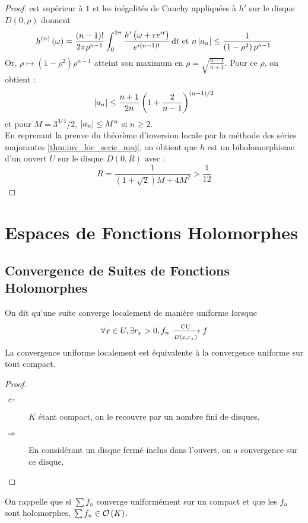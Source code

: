 \documentclass{cours}
\begin{document}
\begin{proof}
    est supérieur à $1$ et les inégalités de Cauchy appliquées à $h'$ sur le disque $D\left(0, \rho\right)$ donnent 
    \begin{equation*}
        h^{\left(n\right)}\left(\omega\right) = \frac{\left(n- 1\right)!}{2\pi\rho^{n-1}}\int_{0}^{2\pi}\frac{h'\left(\omega + re^{it}\right)}{e^{i\left(n - 1\right)t}}{\rm \, d} t \text{ et } n\left|a_{n}\right| \leq \frac{1}{\left(1 - \rho^{2}\right)\rho^{n - 1}}
    \end{equation*}
    Or, $\rho \mapsto \left(1 - \rho^{2}\right)\rho^{n - 1}$ atteint son maximum en $\rho = \sqrt{\frac{n-1}{n + 1}}$. Pour ce $\rho$, on obtient : 
    \begin{equation*}
        \left|a_{n}\right| \leq \frac{n + 1}{2n}\left(1 + \frac{2}{n - 1}\right)^{\left(n-1\right)/2}
    \end{equation*}
    et pour $M = 3^{3/4}/2$, $\left|a_{n}\right| \leq M^{n}$ si $n \geq 2$.\\
    En reprenant la preuve du théorème d'inversion locale par la méthode des séries majorantes \ref{thm:inv_loc_serie_maj}, on obtient que $h$ est un biholomorphisme d'un ouvert $U$ sur le disque $D\left(0, R\right)$ avec : 
    \begin{equation*}
      R = \frac{1}{\left(1 + \sqrt{2}\right)M + 4M^{2}}>\frac{1}{12}
    \end{equation*}
\end{proof}

\section{Espaces de Fonctions Holomorphes}
\subsection{Convergence de Suites de Fonctions Holomorphes}
On dit qu'une suite converge localement de manière uniforme lorsque 
\begin{equation*}
    \forall x \in U, \exists r_{x} > 0, f_{n} \xrightarrow[D\left(x, r_{x}\right)]{\rm CU} f
\end{equation*}
La convergence uniforme localement est équivalente à la convergence uniforme sur tout compact.
\begin{proof}
    \begin{description}
        \item[$\Leftarrow$] $K$ étant compact, on le recouvre par un nombre fini de disques. 
        \item[$\Rightarrow$] En considérant un disque fermé inclus dans l'ouvert, on a convergence sur ce disque.   
    \end{description}
\end{proof}
On rappelle que si $\sum f_{n}$ converge uniformément sur un compact et que les $f_{n}$ sont holomorphes, $\sum f_{n} \in \mathcal{O}\left(K\right)$.
\end{document}
